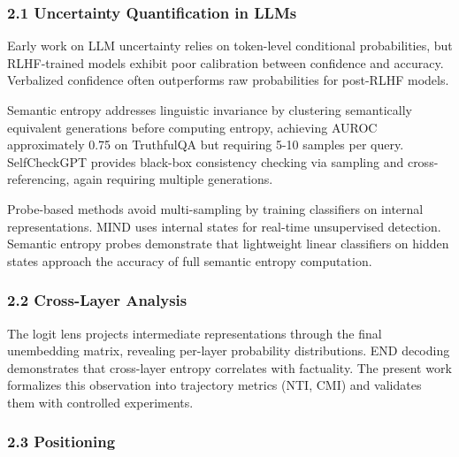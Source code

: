 
\subsubsection{2.1 Uncertainty Quantification in LLMs}

Early work on LLM uncertainty relies on token-level conditional probabilities, but RLHF-trained models exhibit poor calibration between confidence and accuracy. Verbalized confidence often outperforms raw probabilities for post-RLHF models.

Semantic entropy addresses linguistic invariance by clustering semantically equivalent generations before computing entropy, achieving AUROC approximately 0.75 on TruthfulQA but requiring 5-10 samples per query. SelfCheckGPT provides black-box consistency checking via sampling and cross-referencing, again requiring multiple generations.

Probe-based methods avoid multi-sampling by training classifiers on internal representations. MIND uses internal states for real-time unsupervised detection. Semantic entropy probes demonstrate that lightweight linear classifiers on hidden states approach the accuracy of full semantic entropy computation.

\subsubsection{2.2 Cross-Layer Analysis}

The logit lens projects intermediate representations through the final unembedding matrix, revealing per-layer probability distributions. END decoding demonstrates that cross-layer entropy correlates with factuality. The present work formalizes this observation into trajectory metrics (NTI, CMI) and validates them with controlled experiments.

\subsubsection{2.3 Positioning}

\begin{table}[htbp]
\centering
{}
\end{table}

